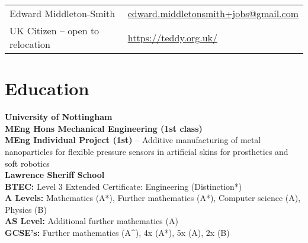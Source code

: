 \documentclass[10pt,a4paper]{article}
\begin{document}
\begin{center}
\begin{tabular}{p{}p{}}
{\huge Edward Middleton-Smith} 
& \href{mailto:edward.middletonsmith+jobs@gmail.com}{edward.middletonsmith+jobs@gmail.com} \\
\vspace{1pt}
UK Citizen – open to relocation 
& \vspace{1pt}
\href{https://teddy.org.uk/}{https://teddy.org.uk/} \\
\end{tabular}
\end{center}

\section*{Education}\vspace{-\baselineskip}\medskip
\textbf{University of Nottingham} \smallskip\\
\textbf{MEng Hons Mechanical Engineering (1st class)}\smallskip\\
\textbf{MEng Individual Project (1st)} -- Additive manufacturing of metal nanoparticles for flexible pressure sensors in artificial skins for prosthetics and soft robotics\vspace{6pt}\\
\textbf{Lawrence Sheriff School} \smallskip\\
\textbf{BTEC:} Level 3 Extended Certificate: Engineering (Distinction*)\\
\textbf{A Levels:} Mathematics (A*), Further mathematics (A*), Computer science (A), Physics (B)\\
\textbf{AS Level:} Additional further mathematics (A)\\
\textbf{GCSE's:} Further mathematics (A\^{}), 4x (A*), 5x (A), 2x (B)
\end{document}

